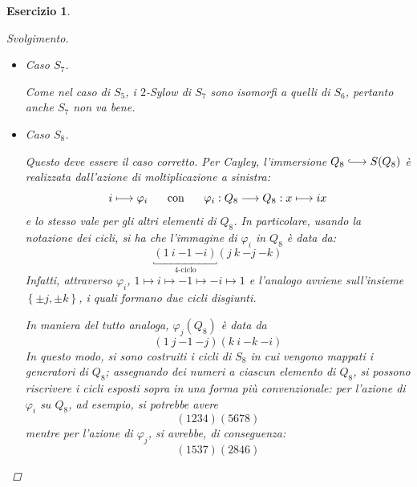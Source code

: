 \documentclass[12pt]{scrartcl}
\theoremstyle{style}
\newtheorem{esercizio}{Esercizio}[section]
\newenvironment{svolgimento}{\renewcommand\qedsymbol{$\blacksquare$}\begin{proof}[Svolgimento]}{\end{proof}}
\numberwithin{equation}{subsection}
\newcommand{\longhookrightarrow}{\lhook\joinrel\longrightarrow}
\begin{document}
\begin{esercizio}
\begin{svolgimento}
\begin{itemize}
			Usando la proposizione \ref{qperm}, il fatto che $\sigma ^2 = \rho ^2 =\eta^2$ abbiano ordine $2$, cio\`e sono composte solo da trasposizioni, e che sono quadrati permette di concludere che si scrivono come il prodotto di trasposizioni; essendo in $S_6$, l'unica possibilit\`a \`e che
			\[
			\sigma ^2 = \rho ^2 = \eta^2 = (a\ b) ( c \ d)
			\] 
			perch\'e, in $S_6$, non esistono due coppie di trasposizioni tutte disgiunte.
			Ora si risolve $x^2 = (12)(34)$, che restituisce le seguenti possibilit\`a:
		\[
		x_1 = (1324) \hspace{1cm}x_2 = (1423) \hspace{1cm} x_3 = (1324)(56) \hspace{1cm} x_4 = (1423)(56)
		\] 
		visto che la trasposizione $(56)$ scompare se elevata al quadrato.
		In questo modo, si vede che le soluzioni possibili sono $4$ in $S_6$, mentre in $Q_8$ se ne avevano $6$ di elementi di ordine $4$ con uguale quadrato.
	\item Caso $S_7$.

		Come nel caso di $S_5$, i $2$-Sylow di $S_7$ sono isomorfi a quelli di $S_6$, pertanto anche $S_7$ non va bene.
	\item Caso $S_8$.

		Questo deve essere il caso corretto.
		Per Cayley, l'immersione $Q_8 \longhookrightarrow S(Q_8)$ \`e realizzata dall'azione di moltiplicazione a sinistra:
		\[
		i\longmapsto \varphi _i \hspace{.5cm} \text{ con } \hspace{.5cm} \varphi _i : Q_8 \longrightarrow Q_8 : x \longmapsto ix
		\] 
		e lo stesso vale per gli altri elementi di $Q_8$.
		In particolare, usando la notazione dei cicli, si ha che l'immagine di $\varphi _i$ in $Q_8$ \`e data da:
		\[
		\underbracket{(1\ i \ {- 1}\ {- i} )}_{4\text{-ciclo}} (j\ k\ {-j}\ {-k})
		\] 
	Infatti, attraverso $\varphi _i$, $1\mapsto i \mapsto -1\mapsto -i\mapsto 1$ e l'analogo avviene sull'insieme $\left\{ \pm j, \pm k \right\} $, i quali formano due cicli disgiunti.

	In maniera del tutto analoga, $\varphi _j(Q_8)$ \`e data da
	\[
		(1\ j\ {-1}\ {-j})(k \ i \ {-k} \ {-i})
	\] 
	In questo modo, si sono costruiti i cicli di $S_8$ in cui vengono mappati i generatori di $Q_8$; assegnando dei numeri a ciascun elemento di $Q_8$, si possono riscrivere i cicli esposti sopra in una forma pi\`u convenzionale: per l'azione di $\varphi _i$ su $Q_8$, ad esempio, si potrebbe avere
	\[
		(1234)(5678)
	\] 
	mentre per l'azione di $\varphi _j$, si avrebbe, di conseguenza:
	\[
		(1537)(2846)
	\] 
	
	\end{itemize}
\end{svolgimento}
\end{esercizio}
\end{document}
